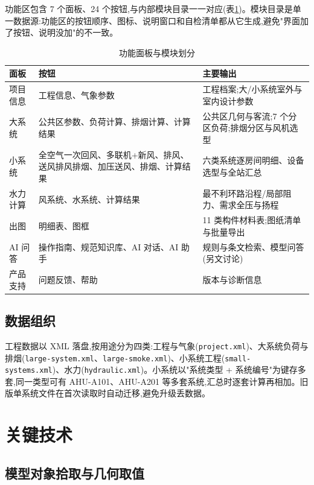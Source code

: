 \documentclass[UTF8,a4paper,zihao=-4]{ctexart}
\begin{document}
功能区包含 7 个面板、24 个按钮,与内部模块目录一一对应(表\ref{tab:modules})。模块目录是单一数据源:功能区的按钮顺序、图标、说明窗口和自检清单都从它生成,避免"界面加了按钮、说明没加"的不一致。

\begin{table}[H]
\centering
\caption{功能面板与模块划分}\label{tab:modules}
\small
\begin{tabular}{p{2.2cm}p{6.4cm}p{5.0cm}}
\toprule
面板 & 按钮 & 主要输出 \\
\midrule
项目信息 & 工程信息、气象参数 & 工程档案;大/小系统室外与室内设计参数 \\
大系统 & 公共区参数、负荷计算、排烟计算、计算结果 & 公共区几何与客流;7 个分区负荷;排烟分区与风机选型 \\
小系统 & 全空气一次回风、多联机+新风、排风、送风排风排烟、加压送风、排烟、计算结果 & 六类系统逐房间明细、设备选型与全站汇总 \\
水力计算 & 风系统、水系统、计算结果 & 最不利环路沿程/局部阻力、需求全压与扬程 \\
出图 & 明细表、图框 & 11 类构件材料表;图纸清单与批量导出 \\
AI 问答 & 操作指南、规范知识库、AI 对话、AI 助手 & 规则与条文检索、模型问答(另文讨论) \\
产品支持 & 问题反馈、帮助 & 版本与诊断信息 \\
\bottomrule
\end{tabular}
\end{table}

\subsection{数据组织}

工程数据以 XML 落盘,按用途分为四类:工程与气象(\texttt{project.xml})、大系统负荷与排烟(\texttt{large-system.xml}、\texttt{large-smoke.xml})、小系统工程(\texttt{small-systems.xml})、水力(\texttt{hydraulic.xml})。小系统以"系统类型 + 系统编号"为键存多套,同一类型可有 AHU-A101、AHU-A201 等多套系统,汇总时逐套计算再相加。旧版单系统文件在首次读取时自动迁移,避免升级丢数据。

\section{关键技术}

\subsection{模型对象拾取与几何取值}
\end{document}
